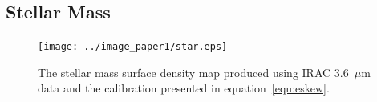 \subsection{Stellar Mass}
\label{sec:starmass}

\begin{figure}
\centering
\texttt{[image: ../image\_paper1/star.eps]}
\caption[Stellar mass surface density map produced using IRAC 3.6~$\mu$m data]{The stellar mass surface density map produced using IRAC 3.6~$\mu$m data and the calibration presented in equation~\ref{equ:eskew}.}
\label{fig:stellarmass}
\end{figure}

